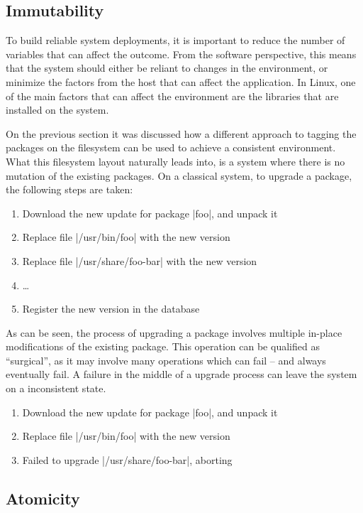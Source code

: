 \subsection{Immutability}

To build reliable system deployments, it is important to reduce the
number of variables that can affect the outcome. From the
software perspective, this means that the system should
either be reliant to changes in the environment, or minimize
the factors from the host that can affect the application.
In Linux, one of the main factors that can affect the
environment are the libraries that are installed on the
system.

On the previous section it was discussed how a different
approach to tagging the packages on the filesystem can be
used to achieve a consistent environment. What this
filesystem layout naturally leads into, is a system where
there is no mutation of the existing packages. On a
classical system, to upgrade a package, the following steps
are taken:

\begin{enumerate}
    \item Download the new update for package |foo|, and unpack it
    \item Replace file |/usr/bin/foo| with the new version
    \item Replace file |/usr/share/foo-bar| with the new version
    \item \ldots
    \item Register the new version in the database
\end{enumerate}

As can be seen, the process of upgrading a package involves
multiple in-place modifications of the existing package.
This operation can be qualified as ``surgical'', as it may
involve many operations which can fail -- and always
eventually fail. A failure in the middle of a upgrade
process can leave the system on a inconsistent state.

\begin{enumerate}
    \item Download the new update for package |foo|, and unpack it
    \item Replace file |/usr/bin/foo| with the new version
    \item Failed to upgrade |/usr/share/foo-bar|, aborting
\end{enumerate}


\subsection{Atomicity}
